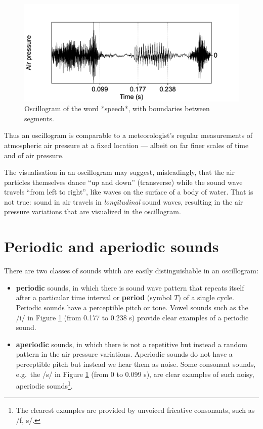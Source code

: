 \documentclass[
]{book}
\begin{document}
\begin{figure}

{\centering \includegraphics{figures/speech_word_oscillogram} 

}

\caption{Oscillogram of the word *speech*, with boundaries between segments.}\label{fig:speech-oscillogram}
\end{figure}

Thus an oscillogram is comparable to a meteorologist's regular measurements of atmospheric air pressure at a fixed location --- albeit on far finer scales of time and of air pressure.

The visualisation in an oscillogram may suggest, misleadingly, that the air particles themselves dance ``up and down'' (transverse) while the sound wave travels ``from left to right'', like waves on the surface of a body of water. That is not true: sound in air travels in \emph{longitudinal} sound waves, resulting in the air pressure variations that are visualized in the oscillogram.

\section{Periodic and aperiodic sounds}\label{sec:periodicity}

There are two classes of sounds which are easily distinguishable in an oscillogram:

\begin{itemize}
\item
  \textbf{periodic} sounds, in which there is sound wave pattern that repeats itself after a particular time interval or \textbf{period} (symbol \(T\)) of a single cycle. Periodic sounds have a perceptible pitch or tone. Vowel sounds such as the /i/ in Figure \ref{fig:speech-oscillogram} (from 0.177 to 0.238 s) provide clear examples of a periodic sound.
\item
  \textbf{aperiodic} sounds, in which there is not a repetitive but instead a random pattern in the air pressure variations. Aperiodic sounds do not have a perceptible pitch but instead we hear them as noise. Some consonant sounds, e.g.~the /s/ in Figure \ref{fig:speech-oscillogram} (from 0 to 0.099 s), are clear examples of such noisy, aperiodic sounds\footnote{The clearest examples are provided by unvoiced fricative consonants, such as /f, s/.}.
\end{itemize}
\end{document}
